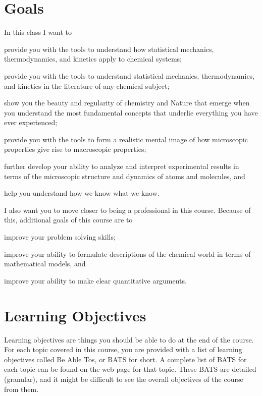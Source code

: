\documentclass[letterpaper,oneside,onecolumn,11pt,article]{memoir}
\begin{document}
\section{Goals}
In this class I want to
\begin{inparaenum}
\item provide you with the tools to understand how statistical mechanics, thermodynamics, and kinetics apply to chemical systems;
\item provide you with the tools to understand statistical mechanics, thermodynamics, and kinetics in the literature of any chemical subject;
\item show you the beauty and regularity of chemistry and Nature that emerge when you understand the most fundamental concepts that underlie everything you have ever experienced;
\item provide you with the tools to form a realistic mental image of how microscopic properties give rise to macroscopic properties;
\item further develop your ability to analyze and interpret experimental results in terms of the microscopic structure and dynamics of atoms and molecules, and 
\item help you understand how we know what we know.
\end{inparaenum}

I also want you to move closer to being a professional in this course. Because of this, additional goals of this course are to
\begin{inparaenum}
\item improve your problem solving skills;
\item improve your ability to formulate descriptions of the chemical world in terms of mathematical models, and
\item improve your ability to make clear quantitative arguments.
\end{inparaenum}
%
%
\section{Learning Objectives}
Learning objectives are things you should be able to do at the end of the course. For each topic covered in this course, you are provided with a list of learning objectives called Be Able Tos, or BATS for short. A complete list of BATS for each topic can be found on the web page for that topic. These BATS are detailed (granular), and it might be difficult to see the overall objectives of the course from them.
\end{document}

